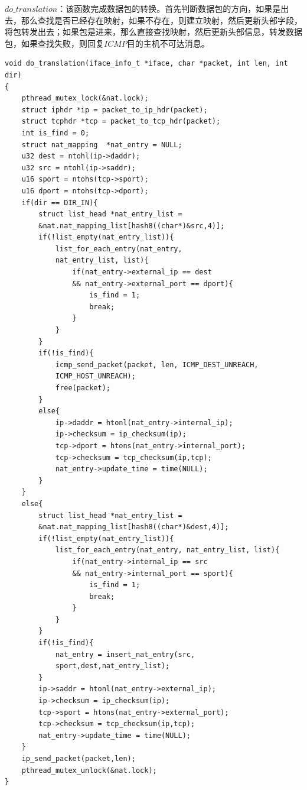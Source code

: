 \documentclass[UTF8,noindent]{ctexart}
\begin{document}
$do\_translation$：该函数完成数据包的转换。首先判断数据包的方向，如果是出去，那么查找是否已经存在映射，如果不存在，则建立映射，然后更新头部字段，将包转发出去；如果包是进来，那么直接查找映射，然后更新头部信息，转发数据包，如果查找失败，则回复$ICMP$目的主机不可达消息。
\begin{lstlisting}
void do_translation(iface_info_t *iface, char *packet, int len, int dir)
{
	pthread_mutex_lock(&nat.lock);
	struct iphdr *ip = packet_to_ip_hdr(packet);
	struct tcphdr *tcp = packet_to_tcp_hdr(packet);
	int is_find = 0;
	struct nat_mapping  *nat_entry = NULL;
	u32 dest = ntohl(ip->daddr);
	u32 src = ntohl(ip->saddr);
	u16 sport = ntohs(tcp->sport);
	u16 dport = ntohs(tcp->dport);
	if(dir == DIR_IN){
		struct list_head *nat_entry_list = 
		&nat.nat_mapping_list[hash8((char*)&src,4)];
		if(!list_empty(nat_entry_list)){
			list_for_each_entry(nat_entry, 
			nat_entry_list, list){
				if(nat_entry->external_ip == dest 
				&& nat_entry->external_port == dport){
					is_find = 1;
					break;
				}
			}
		}
		if(!is_find){
			icmp_send_packet(packet, len, ICMP_DEST_UNREACH, 
			ICMP_HOST_UNREACH);
			free(packet);
		}
		else{
			ip->daddr = htonl(nat_entry->internal_ip);
			ip->checksum = ip_checksum(ip);
			tcp->dport = htons(nat_entry->internal_port);
			tcp->checksum = tcp_checksum(ip,tcp);
			nat_entry->update_time = time(NULL);
		}
	}
	else{
		struct list_head *nat_entry_list = 
		&nat.nat_mapping_list[hash8((char*)&dest,4)];
		if(!list_empty(nat_entry_list)){
			list_for_each_entry(nat_entry, nat_entry_list, list){
				if(nat_entry->internal_ip == src 
				&& nat_entry->internal_port == sport){
					is_find = 1;
					break;
				}
			}
		}
		if(!is_find){
			nat_entry = insert_nat_entry(src,
			sport,dest,nat_entry_list);
		}
		ip->saddr = htonl(nat_entry->external_ip);
		ip->checksum = ip_checksum(ip);
		tcp->sport = htons(nat_entry->external_port);
		tcp->checksum = tcp_checksum(ip,tcp);
		nat_entry->update_time = time(NULL);
	}
	ip_send_packet(packet,len);
	pthread_mutex_unlock(&nat.lock);
}
\end{lstlisting}
\end{document}
